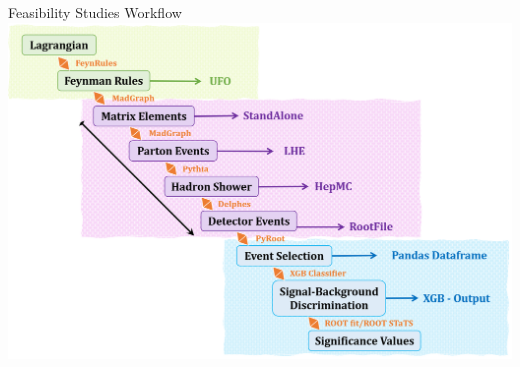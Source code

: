 \documentclass{../bredelebeamer}
\begin{document}

\begin{frame}{Feasibility Studies Workflow}
	\includegraphics[width=1.0\linewidth]{../2023_paper/Workflow.png}
\end{frame}
\end{document}
